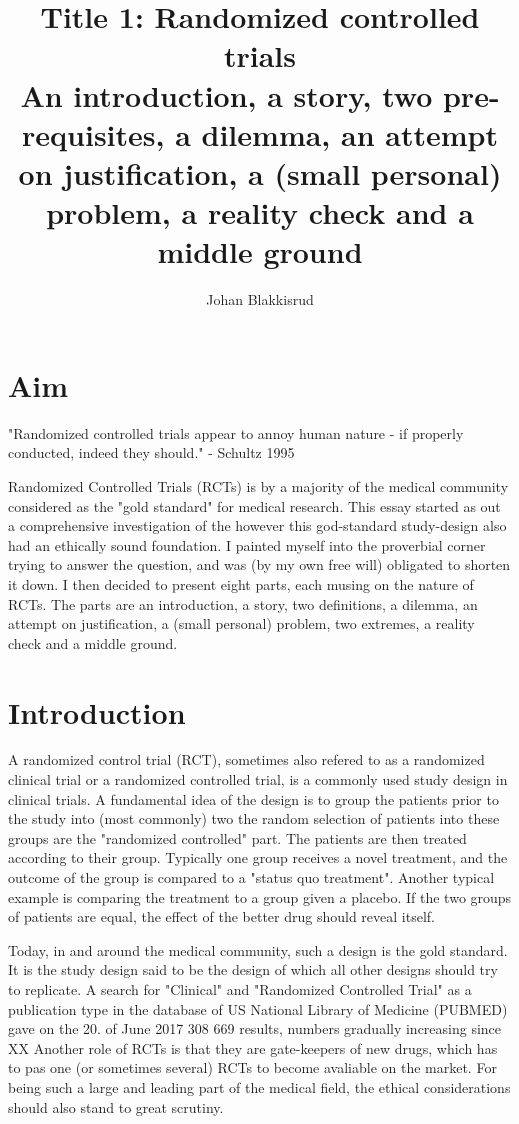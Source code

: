 \documentclass[12p]{article}
\title{Title 1: Randomized controlled trials \\ \large{An introduction, a story, two pre-requisites, a dilemma, an attempt on justification, a (small personal) problem, a reality check and a middle ground}
}
\author{Johan Blakkisrud}
\begin{document}
\maketitle

\section*{Aim}

"Randomized controlled trials appear to annoy human nature - if properly conducted, indeed they should." - Schultz 1995

Randomized Controlled Trials (RCTs) is by a majority of the medical community considered as the "gold standard" for medical research.
This essay started as out a comprehensive investigation of the however this god-standard study-design also had an ethically sound foundation.
I painted myself into the proverbial corner trying to answer the question, and was (by my own free will) obligated to shorten it down.
I then decided to present eight parts, each musing on the nature of RCTs.
The parts are an introduction, a story, two definitions, a dilemma, an attempt on justification, a (small personal) problem, two extremes, a reality check and a middle ground.

\section*{Introduction}

A randomized control trial (RCT), sometimes also refered to as a randomized clinical trial or a randomized controlled trial, is a commonly used study design in clinical trials.
A fundamental idea of the design is to group the patients prior to the study into (most commonly) two the random selection of patients into these groups are the "randomized controlled" part.
The patients are then treated according to their group.
Typically one group receives a novel treatment, and the outcome of the group is compared to a "status quo treatment".
Another typical example is comparing the treatment to a group given a placebo. 
If the two groups of patients are equal, the effect of the better drug should reveal itself.

Today, in and around the medical community, such a design is the gold standard.
It is the study design said to be the design of which all other designs should try to replicate. 
A search for "Clinical" and "Randomized Controlled Trial" as a publication type in the database of US National Library of Medicine (PUBMED) gave on the 20. of June 2017 308 669 results, numbers gradually increasing since XX
Another role of RCTs is that they are gate-keepers of new drugs, which has to pas one (or sometimes several) RCTs to become avaliable on the market. 
For being such a large and leading part of the medical field, the ethical considerations should also stand to great scrutiny.
\end{document}

